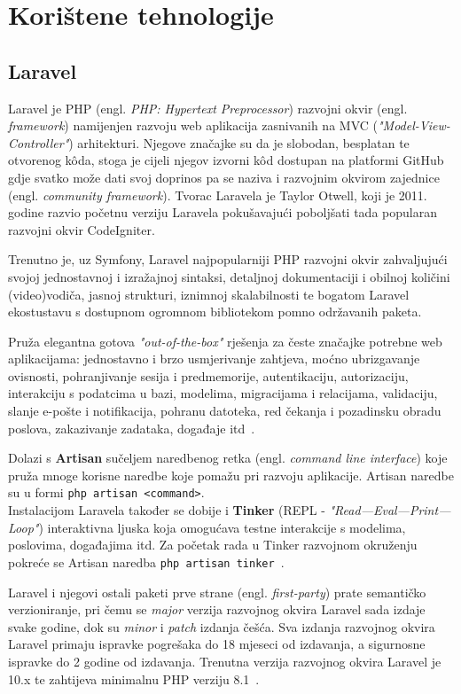 \section{Korištene tehnologije}

\subsection{Laravel}
Laravel je PHP (engl. \textit{PHP: Hypertext Preprocessor}) razvojni okvir (engl. \textit{framework}) namijenjen razvoju web aplikacija zasnivanih na MVC (\textit{"Model-View-Controller"}) arhitekturi. Njegove značajke su da je slobodan, besplatan te otvorenog k\^oda, stoga je cijeli njegov izvorni k\^od dostupan na platformi GitHub~\cite{laravelGitHub} gdje svatko može dati svoj doprinos pa se naziva i razvojnim okvirom zajednice (engl. \textit{community framework}). Tvorac Laravela je Taylor Otwell, koji je 2011. godine razvio početnu verziju Laravela pokušavajući poboljšati tada popularan razvojni okvir CodeIgniter.

Trenutno je, uz Symfony, Laravel najpopularniji PHP razvojni okvir zahvaljujući svojoj jednostavnoj i izražajnoj sintaksi, detaljnoj dokumentaciji i obilnoj količini (video)vodiča, jasnoj strukturi, iznimnoj skalabilnosti te bogatom Laravel ekostustavu s dostupnom ogromnom bibliotekom pomno održavanih paketa.

Pruža elegantna gotova \textit{"out-of-the-box"} rješenja za česte značajke potrebne web aplikacijama: jednostavno i brzo usmjerivanje zahtjeva, moćno ubrizgavanje ovisnosti, pohranjivanje sesija i predmemorije, autentikaciju, autorizaciju, interakciju s podatcima u bazi, modelima, migracijama i relacijama, validaciju, slanje e-pošte i notifikacija, pohranu datoteka, red čekanja i pozadinsku obradu poslova, zakazivanje zadataka, događaje itd~\cite{laravel}.

Dolazi s \textbf{Artisan} sučeljem naredbenog retka (engl. \textit{command line interface}) koje pruža mnoge korisne naredbe koje pomažu pri razvoju aplikacije. Artisan naredbe su u formi \texttt{php artisan <command>}.\\ 
Instalacijom Laravela također se dobije i \textbf{Tinker} (REPL - \textit{"Read—Eval—Print—Loop"}) interaktivna ljuska koja omogućava testne interakcije s modelima, poslovima, događajima itd. Za početak rada u Tinker razvojnom okruženju pokreće se Artisan naredba \texttt{php artisan tinker}~\cite{artisanConsole}.

Laravel i njegovi ostali paketi prve strane (engl. \textit{first-party}) prate semantičko verzioniranje, pri čemu se \textit{major} verzija razvojnog okvira Laravel sada izdaje svake godine, dok su \textit{minor} i \textit{patch} izdanja češća. Sva izdanja razvojnog okvira Laravel primaju ispravke pogrešaka do 18 mjeseci od izdavanja, a sigurnosne ispravke do 2 godine od izdavanja.
Trenutna verzija razvojnog okvira Laravel je 10.x te zahtijeva minimalnu PHP verziju 8.1~\cite{releaseNotes}. 
 
